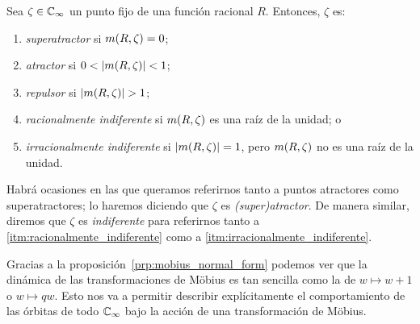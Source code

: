 \begin{definicion}
  Sea $\zeta \in \mathbb{C}_\infty$ un punto fijo de una función racional $R$. Entonces,
  $\zeta$ es:
  \begin{enumerate}[label=(\alph*)]
    \item \emph{superatractor} si $m({R}, {\zeta}) = 0$;
    \item \emph{atractor} si $0 < |m({R}, {\zeta})| < 1$;
    \item \emph{repulsor} si $|m({R}, {\zeta})| > 1$;
    \item \emph{racionalmente indiferente} si $m({R}, {\zeta})$ es una
          raíz de la unidad; o \label{itm:racionalmente_indiferente}
    \item \emph{irracionalmente indiferente} si $|m({R}, {\zeta})| = 1$,
          pero $m({R}, {\zeta})$ no es una raíz de la unidad. \label{itm:irracionalmente_indiferente}
  \end{enumerate}
\end{definicion}

Habrá ocasiones en las que queramos referirnos tanto a puntos atractores como
superatractores; lo haremos diciendo que $\zeta$ es \emph{(super)atractor}. De
manera similar, diremos que $\zeta$ es \emph{indiferente} para referirnos tanto
a \ref{itm:racionalmente_indiferente} como a
\ref{itm:irracionalmente_indiferente}.

Gracias a la proposición~\ref{prp:mobius_normal_form} podemos ver que la
dinámica de las transformaciones de Möbius es tan sencilla como la de $w
\mapsto w + 1$ o $w \mapsto qw$. Esto nos va a permitir describir
explícitamente el comportamiento de las órbitas de todo $\mathbb{C}_\infty$ bajo la acción
de una transformación de Möbius.


